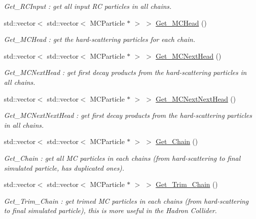 \begin{DoxyCompactItemize}
\begin{DoxyCompactList}\small\item\em Get\_\-RCInput : get all input RC particles in all chains. \item\end{DoxyCompactList}\item 
std::vector$<$ std::vector$<$ MCParticle $\ast$ $>$ $>$ \hyperlink{classToolSet_1_1CChain__Vec_a27f257b172bd9fd5447d71dd69b9faff}{Get\_\-MCHead} ()
\begin{DoxyCompactList}\small\item\em Get\_\-MCHead : get the hard-\/scattering particles for each chain. \item\end{DoxyCompactList}\item 
std::vector$<$ std::vector$<$ MCParticle $\ast$ $>$ $>$ \hyperlink{classToolSet_1_1CChain__Vec_a22c91bb1f15d6139b942e08920851aad}{Get\_\-MCNextHead} ()
\begin{DoxyCompactList}\small\item\em Get\_\-MCNextHead : get first decay products from the hard-\/scattering particles in all chains. \item\end{DoxyCompactList}\item 
std::vector$<$ std::vector$<$ MCParticle $\ast$ $>$ $>$ \hyperlink{classToolSet_1_1CChain__Vec_a2546469860c85e211a76a3ec8cbf0bf2}{Get\_\-MCNextNextHead} ()
\begin{DoxyCompactList}\small\item\em Get\_\-MCNextNextHead : get first decay products from the hard-\/scattering particles in all chains. \item\end{DoxyCompactList}\item 
std::vector$<$ std::vector$<$ MCParticle $\ast$ $>$ $>$ \hyperlink{classToolSet_1_1CChain__Vec_a1192336ddae3a84cdaa2915b28955ccf}{Get\_\-Chain} ()
\begin{DoxyCompactList}\small\item\em Get\_\-Chain : get all MC particles in each chains (from hard-\/scattering to final simulated particle, has duplicated ones). \item\end{DoxyCompactList}\item 
std::vector$<$ std::vector$<$ MCParticle $\ast$ $>$ $>$ \hyperlink{classToolSet_1_1CChain__Vec_ad96b299f6d9bf91831d20d0aac3d32ba}{Get\_\-Trim\_\-Chain} ()
\begin{DoxyCompactList}\small\item\em Get\_\-Trim\_\-Chain : get trimed MC particles in each chains (from hard-\/scattering to final simulated particle), this is more useful in the Hadron Collider. \item\end{DoxyCompactList}\item 

\end{DoxyCompactItemize}
